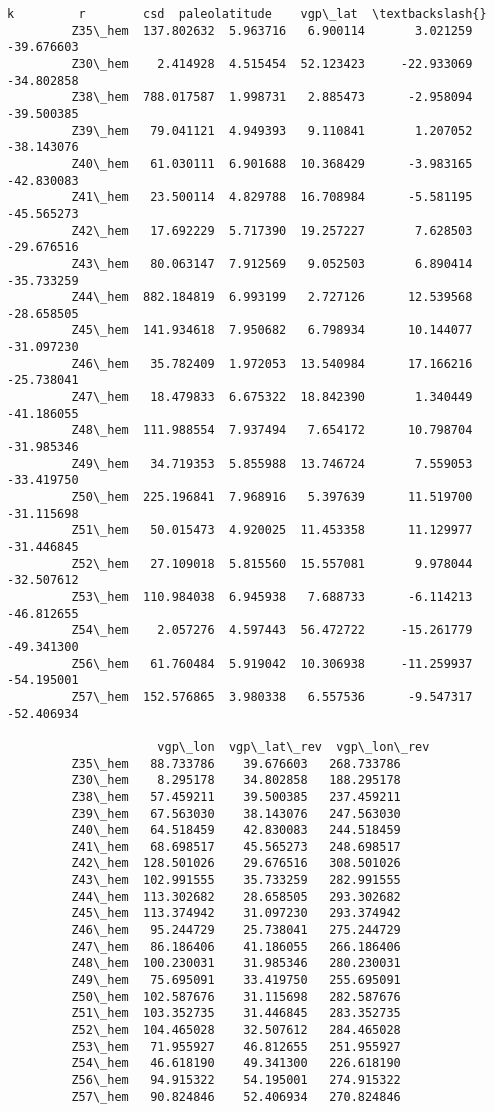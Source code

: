 \documentclass[11pt]{article}
\begin{document}
\begin{Verbatim}[commandchars=\\\{\}]
                           k         r        csd  paleolatitude    vgp\_lat  \textbackslash{}
         Z35\_hem  137.802632  5.963716   6.900114       3.021259 -39.676603   
         Z30\_hem    2.414928  4.515454  52.123423     -22.933069 -34.802858   
         Z38\_hem  788.017587  1.998731   2.885473      -2.958094 -39.500385   
         Z39\_hem   79.041121  4.949393   9.110841       1.207052 -38.143076   
         Z40\_hem   61.030111  6.901688  10.368429      -3.983165 -42.830083   
         Z41\_hem   23.500114  4.829788  16.708984      -5.581195 -45.565273   
         Z42\_hem   17.692229  5.717390  19.257227       7.628503 -29.676516   
         Z43\_hem   80.063147  7.912569   9.052503       6.890414 -35.733259   
         Z44\_hem  882.184819  6.993199   2.727126      12.539568 -28.658505   
         Z45\_hem  141.934618  7.950682   6.798934      10.144077 -31.097230   
         Z46\_hem   35.782409  1.972053  13.540984      17.166216 -25.738041   
         Z47\_hem   18.479833  6.675322  18.842390       1.340449 -41.186055   
         Z48\_hem  111.988554  7.937494   7.654172      10.798704 -31.985346   
         Z49\_hem   34.719353  5.855988  13.746724       7.559053 -33.419750   
         Z50\_hem  225.196841  7.968916   5.397639      11.519700 -31.115698   
         Z51\_hem   50.015473  4.920025  11.453358      11.129977 -31.446845   
         Z52\_hem   27.109018  5.815560  15.557081       9.978044 -32.507612   
         Z53\_hem  110.984038  6.945938   7.688733      -6.114213 -46.812655   
         Z54\_hem    2.057276  4.597443  56.472722     -15.261779 -49.341300   
         Z56\_hem   61.760484  5.919042  10.306938     -11.259937 -54.195001   
         Z57\_hem  152.576865  3.980338   6.557536      -9.547317 -52.406934   
         
                     vgp\_lon  vgp\_lat\_rev  vgp\_lon\_rev  
         Z35\_hem   88.733786    39.676603   268.733786  
         Z30\_hem    8.295178    34.802858   188.295178  
         Z38\_hem   57.459211    39.500385   237.459211  
         Z39\_hem   67.563030    38.143076   247.563030  
         Z40\_hem   64.518459    42.830083   244.518459  
         Z41\_hem   68.698517    45.565273   248.698517  
         Z42\_hem  128.501026    29.676516   308.501026  
         Z43\_hem  102.991555    35.733259   282.991555  
         Z44\_hem  113.302682    28.658505   293.302682  
         Z45\_hem  113.374942    31.097230   293.374942  
         Z46\_hem   95.244729    25.738041   275.244729  
         Z47\_hem   86.186406    41.186055   266.186406  
         Z48\_hem  100.230031    31.985346   280.230031  
         Z49\_hem   75.695091    33.419750   255.695091  
         Z50\_hem  102.587676    31.115698   282.587676  
         Z51\_hem  103.352735    31.446845   283.352735  
         Z52\_hem  104.465028    32.507612   284.465028  
         Z53\_hem   71.955927    46.812655   251.955927  
         Z54\_hem   46.618190    49.341300   226.618190  
         Z56\_hem   94.915322    54.195001   274.915322  
         Z57\_hem   90.824846    52.406934   270.824846  
\end{Verbatim}
        
\end{document}
